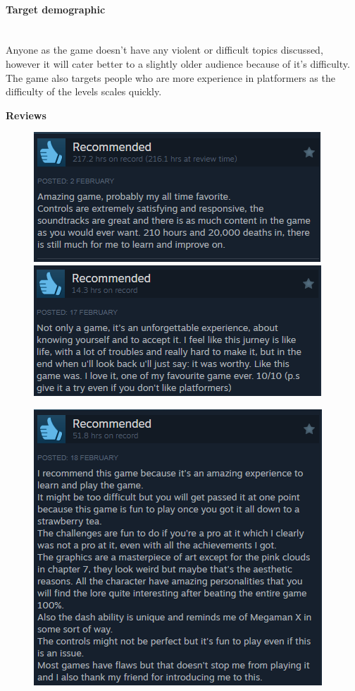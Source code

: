 \documentclass{article}
\newcommand{\myparagraph}[1]{\paragraph{#1}\mbox{}\\} %
\newcommand{\smallBr}{\vspace{1.5mm}}
\begin{document}
\myparagraph{Target demographic}
Anyone as the game doesn't have any violent or difficult topics discussed, however it will cater better to a slightly older audience because of it's difficulty. The game also targets people who are more experience in platformers as the difficulty of the levels scales quickly.

\smallBr
\textbf{Reviews} \linebreak
\begin{figure}[h]
\centering
\begin{minipage}{0.4\linewidth}
\includegraphics[width=\linewidth]{Celeste review 1}
\smallBr
\includegraphics[width=\linewidth]{Celeste review 3}
\end{minipage}
\begin{minipage}{0.4\linewidth}
\includegraphics[width=\linewidth]{Celeste review 2}

\end{minipage}
\end{figure}
\end{document}
